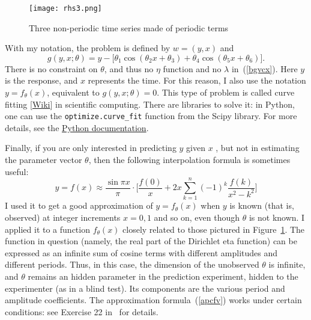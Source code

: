 \documentclass[oneside,10pt]{book}
\begin{document}
\begin{figure}[H]
\centering
\texttt{[image: rhs3.png]}
\caption{Three non-periodic time series made of periodic terms}
\label{fig:rhs3v2}
\end{figure}


With my notation, the problem is
 defined by $w=(y,x)$ and
 \begin{equation}
g(y,x;\theta)= y - \Big[\theta_1 \cos(\theta_2 x + \theta_3) + \theta_4\cos (\theta_5 x + \theta_6)\Big]. \label{rtfer}
\end{equation}
There is no constraint on $\theta$, and thus no $\eta$ function and no $\lambda$ in~(\ref{bgvcx}). Here $y$ is the response, and $x$ represents the time. For this reason, I also use the notation $y=f_\theta(x)$, equivalent to $g(y,x;\theta)=0$. This type of problem is called \textcolor{index}{curve fitting}
 [\href{https://en.wikipedia.org/wiki/Curve_fitting}{Wiki}] in scientific computing. There are libraries to solve it: in Python,
 one can use the \texttt{optimize.curve\_fit} function from the Scipy library. For more details, see the
 \href{https://docs.scipy.org/doc/scipy/reference/generated/scipy.optimize.curve_fit.html}{Python documentation}.



Finally, if you are only interested in predicting $y$ given $x$ , but not in estimating the parameter vector $\theta$, then the following interpolation formula
is sometimes useful:
\begin{equation}
y=f(x)\approx \frac{\sin\pi x}{\pi}\cdot \Bigg[ \frac{f(0)}{x} + 2x\sum_{k=1}^n (-1)^k \frac{f(k)}{x^2-k^2}\Bigg] \label{apcfv}
\end{equation}
I used it  to get a good approximation of $y=f_\theta(x)$ when $y$ is known (that is, observed) at
integer increments $x=0,1$ and so on, even though $\theta$ is not known. I applied it to a function $f_\theta(x)$ closely related
to those pictured in Figure~\ref{fig:rhs3v2}. The function in question (namely, the real part of the Dirichlet eta function) can be expressed as an infinite sum of cosine terms with different amplitudes and different periods.
 Thus, in this case, the dimension of the unobserved $\theta$ is infinite, and $\theta$ remains an hidden parameter in the prediction experiment, hidden to the experimenter (as in a blind test). Its components are the various period and amplitude coefficients.
 The approximation formula~(\ref{apcfv}) works under certain conditions: see Exercise 22 in~\cite{vgelsevier} for details.
\end{document}
